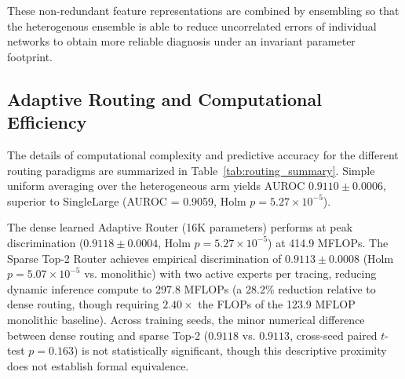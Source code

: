 \documentclass{ICIC2026}
\begin{document}
These non-redundant feature representations are combined by ensembling so that the heterogenous ensemble is able to reduce uncorrelated errors of individual networks to obtain more reliable diagnosis under an invariant parameter footprint.

\subsection{Adaptive Routing and Computational Efficiency}
\label{subsec:res_routing}

The details of computational complexity and predictive accuracy for the different routing paradigms are summarized in Table~\ref{tab:routing_summary}. Simple uniform averaging over the heterogeneous arm yields AUROC $0.9110 \pm 0.0006$, superior to SingleLarge (AUROC = 0.9059, Holm $p = 5.27 \times 10^{-5}$).

\begin{table}[t]
\caption{Adaptive Routing Strategy Comparison (5 Seeds)}
\label{tab:routing_summary}
\centering
\begin{ICICtable}
\end{ICICtable}
\end{table}

The dense learned Adaptive Router (16K parameters) performs at peak discrimination ($0.9118 \pm 0.0004$, Holm $p = 5.27 \times 10^{-5}$) at 414.9 MFLOPs. The Sparse Top-2 Router achieves empirical discrimination of $0.9113 \pm 0.0008$ (Holm $p = 5.07 \times 10^{-5}$ vs. monolithic) with two active experts per tracing, reducing dynamic inference compute to 297.8 MFLOPs (a 28.2\% reduction relative to dense routing, though requiring $2.40\times$ the FLOPs of the 123.9 MFLOP monolithic baseline). Across training seeds, the minor numerical difference between dense routing and sparse Top-2 ($0.9118$ vs. $0.9113$, cross-seed paired $t$-test $p = 0.163$) is not statistically significant, though this descriptive proximity does not establish formal equivalence.
\end{document}
